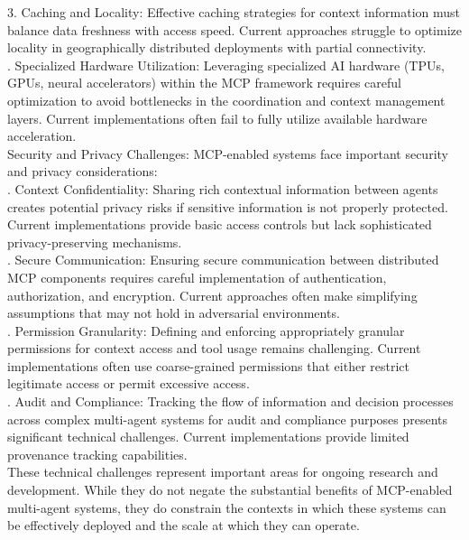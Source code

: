 3. Caching and Locality: Effective caching strategies for context information must balance data freshness with access speed. Current approaches struggle to optimize locality in geographically distributed deployments with partial connectivity.\\ . Specialized Hardware Utilization: Leveraging specialized AI hardware (TPUs, GPUs, neural accelerators) within the MCP framework requires careful optimization to avoid bottlenecks in the coordination and context management layers. Current implementations often fail to fully utilize available hardware acceleration.\\ \newline
Security and Privacy Challenges: MCP-enabled systems face important security and privacy considerations:\\ . Context Confidentiality: Sharing rich contextual information between agents creates potential privacy risks if sensitive information is not properly protected. Current implementations provide basic access controls but lack sophisticated privacy-preserving mechanisms.\\ . Secure Communication: Ensuring secure communication between distributed MCP components requires careful implementation of authentication, authorization, and encryption. Current approaches often make simplifying assumptions that may not hold in adversarial environments.\\ . Permission Granularity: Defining and enforcing appropriately granular permissions for context access and tool usage remains challenging. Current implementations often use coarse-grained permissions that either restrict legitimate access or permit excessive access.\\ . Audit and Compliance: Tracking the flow of information and decision processes across complex multi-agent systems for audit and compliance purposes presents significant technical challenges. Current implementations provide limited provenance tracking capabilities.\\ \newline
These technical challenges represent important areas for ongoing research and development. While they do not negate the substantial benefits of MCP-enabled multi-agent systems, they do constrain the contexts in which these systems can be effectively deployed and the scale at which they can operate.\\
